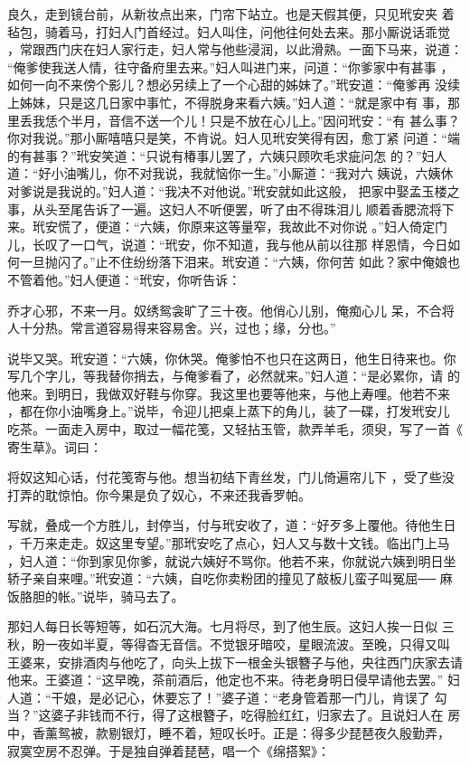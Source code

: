 良久，走到镜台前，从新妆点出来，门帘下站立。也是天假其便，只见玳安夹
着毡包，骑着马，打妇人门首经过。妇人叫住，问他往何处去来。那小厮说话乖觉
，常跟西门庆在妇人家行走，妇人常与他些浸润，以此滑熟。一面下马来，说道：
“俺爹使我送人情，往守备府里去来。”妇人叫进门来，问道：“你爹家中有甚事
，如何一向不来傍个影儿？想必另续上了一个心甜的姊妹了。”玳安道：“俺爹再
没续上姊妹，只是这几日家中事忙，不得脱身来看六姨。”妇人道：“就是家中有
事，那里丢我恁个半月，音信不送一个儿！只是不放在心儿上。”因问玳安：“有
甚么事？你对我说。”那小厮嘻嘻只是笑，不肯说。妇人见玳安笑得有因，愈丁紧
问道：“端的有甚事？”玳安笑道：“只说有椿事儿罢了，六姨只顾吹毛求疵问怎
的？”妇人道：“好小油嘴儿，你不对我说，我就恼你一生。”小厮道：“我对六
姨说，六姨休对爹说是我说的。”妇人道：“我决不对他说。”玳安就如此这般，
把家中娶孟玉楼之事，从头至尾告诉了一遍。这妇人不听便罢，听了由不得珠泪儿
顺着香腮流将下来。玳安慌了，便道：“六姨，你原来这等量窄，我故此不对你说
。”妇人倚定门儿，长叹了一口气，说道：“玳安，你不知道，我与他从前以往那
样恩情，今日如何一旦抛闪了。”止不住纷纷落下泪来。玳安道：“六姨，你何苦
如此？家中俺娘也不管着他。”妇人便道：“玳安，你听告诉：

乔才心邪，不来一月。奴绣鸳衾旷了三十夜。他俏心儿别，俺痴心儿
呆，不合将人十分热。常言道容易得来容易舍。兴，过也；缘，分也。”

说毕又哭。玳安道：“六姨，你休哭。俺爹怕不也只在这两日，他生日待来也。你
写几个字儿，等我替你捎去，与俺爹看了，必然就来。”妇人道：“是必累你，请
的他来。到明日，我做双好鞋与你穿。我这里也要等他来，与他上寿哩。他若不来
，都在你小油嘴身上。”说毕，令迎儿把桌上蒸下的角儿，装了一碟，打发玳安儿
吃茶。一面走入房中，取过一幅花笺，又轻拈玉管，款弄羊毛，须臾，写了一首《
寄生草》。词曰：

将奴这知心话，付花笺寄与他。想当初结下青丝发，门儿倚遍帘儿下
，受了些没打弄的耽惊怕。你今果是负了奴心，不来还我香罗帕。

写就，叠成一个方胜儿，封停当，付与玳安收了，道：“好歹多上覆他。待他生日
，千万来走走。奴这里专望。”那玳安吃了点心，妇人又与数十文钱。临出门上马
，妇人道：“你到家见你爹，就说六姨好不骂你。他若不来，你就说六姨到明日坐
轿子亲自来哩。”玳安道：“六姨，自吃你卖粉团的撞见了敲板儿蛮子叫冤屈──
麻饭胳胆的帐。”说毕，骑马去了。

那妇人每日长等短等，如石沉大海。七月将尽，到了他生辰。这妇人挨一日似
三秋，盼一夜如半夏，等得杳无音信。不觉银牙暗咬，星眼流波。至晚，只得又叫
王婆来，安排酒肉与他吃了，向头上拔下一根金头银簪子与他，央往西门庆家去请
他来。王婆道：“这早晚，茶前酒后，他定也不来。待老身明日侵早请他去罢。”
妇人道：“干娘，是必记心，休要忘了！”婆子道：“老身管着那一门儿，肯误了
勾当？”这婆子非钱而不行，得了这根簪子，吃得脸红红，归家去了。且说妇人在
房中，香薰鸳被，款剔银灯，睡不着，短叹长吁。正是：得多少琵琶夜久殷勤弄，
寂寞空房不忍弹。于是独自弹着琵琶，唱一个《绵搭絮》：


